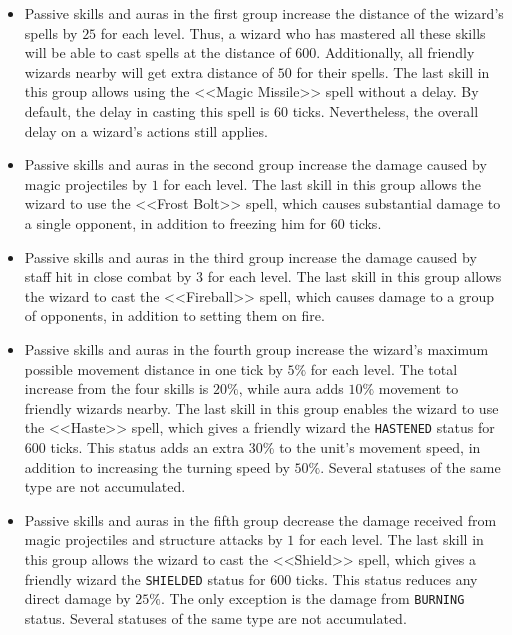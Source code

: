 \begin{itemize}
            \item Passive skills and auras in the first group increase the distance of the wizard’s spells by $25$ for each level. Thus, a wizard
            who has mastered all these skills will be able to cast spells at the distance of $600$. Additionally, all friendly wizards nearby will get
            extra distance of $50$ for their spells. The last skill in this group allows using the <<Magic Missile>> spell
            without a delay. By default, the delay in casting this spell is $60$ ticks. Nevertheless, the overall delay on a wizard’s
            actions still applies.
            \item Passive skills and auras in the second group increase the damage caused by magic projectiles by $1$ for each level. The last skill
            in this group allows the wizard to use the <<Frost Bolt>> spell, which causes substantial damage to a single opponent, in addition to
            freezing him for $60$ ticks.
            \item Passive skills and auras in the third group increase the damage caused by staff hit in close combat by $3$ for each level. The last
            skill in this group allows the wizard to cast the <<Fireball>> spell, which causes damage to a group of opponents, in addition to
            setting them on fire.
            \item Passive skills and auras in the fourth group increase the wizard’s maximum possible movement distance in one tick by $5\%$ for each level.
            The total increase from the four skills is $20\%$, while aura adds $10\%$ movement to friendly wizards
            nearby. The last skill in this group enables the wizard to use the <<Haste>> spell, which gives a friendly
            wizard the \texttt{HASTENED} status for $600$ ticks. This status adds an extra $30\%$ to the unit’s movement speed, in addition to
            increasing the turning speed by $50\%$. Several statuses of the same type are not accumulated.
            \item Passive skills and auras in the fifth group decrease the damage received from magic projectiles and structure attacks by $1$ for each level.
            The last skill in this group allows the wizard to cast the <<Shield>> spell, which gives a friendly wizard the
            \texttt{SHIELDED} status for $600$ ticks. This status reduces any direct damage by $25\%$. The only exception is the damage from
            \texttt{BURNING} status. Several statuses of the same type are not accumulated.
\end{itemize}
 
